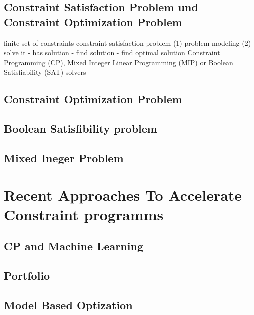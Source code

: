 \subsection{Constraint Satisfaction Problem und Constraint Optimization Problem} 
\label{sec:Constraint Satisfaction Problem und Constraint Optimization Problem}

finite set of constraints \cite[1]{aptjo} constraint satisfaction problem
\cite[1]{aptjo} (1) problem modeling (2) solve it - has solution - find solution
- find optimal solution
\cite*[postnote]{aptjo}
Constraint Programming (CP), Mixed Integer Linear Programming (MIP) or Boolean
Satisfiability (SAT) solvers



\subsection{Constraint Optimization Problem}
\label{sec: Constraint Optimization Problem}


\subsection{Boolean Satisfibility problem}
\label{sec: Boolean Satisfibility problem}


\subsection{Mixed Ineger Problem}
\label{sec: Mixed Ineger Problem}


\section{Recent Approaches To Accelerate Constraint programms}
\label{sec:Recent Approaches To Accelerate Constraint programms}


\subsection{CP and Machine Learning}
\label{sec:CP and Machine Learning}

  
\subsection{Portfolio}
\label{sec:Portfolio}

  
\subsection{Model Based Optization}
\label{sec:Model Based Optization}


